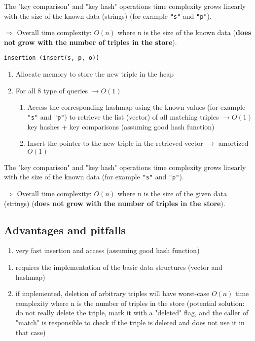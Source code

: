 The "key comparison" and "key hash" operations time complexity grows linearly with the size of the known data (strings) (for example \verb!"s"! and \verb!"p"!).

$\Rightarrow$ Overall time complexity: $O(n)$ where n is the size of the known data (\textbf{does not grow with the number of triples in the store}).

\bigskip
\begin{tcolorbox}
\verb!insertion (insert(s, p, o))!
\end{tcolorbox}

\begin{enumerate}
    \item
    Allocate memory to store the new triple in the heap
    \item
    For all 8 type of queries $\rightarrow O(1)$
    \begin{enumerate}
        \item
        Access the corresponding hashmap using the known values (for example \verb!"s"! and \verb!"p"!) to retrieve the list (vector) of all matching triples $\rightarrow O(1)$ key hashes + key comparisons (assuming good hash function)
        \item
        Insert the pointer to the new triple in the retrieved vector $\rightarrow$ amortized $O(1)$
    \end{enumerate}
\end{enumerate}

The "key comparison" and "key hash" operations time complexity grows linearly with the size of the known data (for example \verb!"s"! and \verb!"p"!).

$\Rightarrow$ Overall time complexity: $O(n)$ where n is the size of the given data (strings) (\textbf{does not grow with the number of triples in the store}).



\pagebreak
\subsection{Advantages and pitfalls}
\begin{enumerate}[label={$\boldsymbol{+}$}]
    \item
    very fast insertion and access (assuming good hash function)
\end{enumerate}
\bigskip
\begin{enumerate}[label={$\boldsymbol{-}$}]
    \item
    requires the implementation of the basic data structures (vector and hashmap)
    \item
    if implemented, deletion of arbitrary triples will have worst-case $O(n)$ time complexity where n is the number of triples in the store (potential solution: do not really delete the triple, mark it with a "deleted" flag, and the caller of "match" is responsible to check if the triple is deleted and does not use it in that case)
\end{enumerate}




